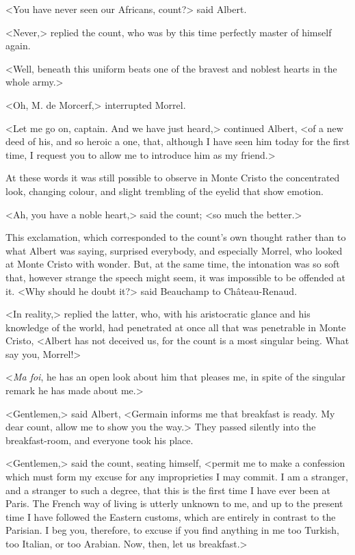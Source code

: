  <You have never seen our Africans, count?> said Albert. 

 <Never,> replied the count, who was by this time perfectly master of himself again. 

 <Well, beneath this uniform beats one of the bravest and noblest hearts in the whole army.> 

 <Oh, M. de Morcerf,> interrupted Morrel. 

 <Let me go on, captain. And we have just heard,> continued Albert, <of a new deed of his, and so heroic a one, that, although I have seen him today for the first time, I request you to allow me to introduce him as my friend.> 

 At these words it was still possible to observe in Monte Cristo the concentrated look, changing colour, and slight trembling of the eyelid that show emotion. 

 <Ah, you have a noble heart,> said the count; <so much the better.> 

 This exclamation, which corresponded to the count's own thought rather than to what Albert was saying, surprised everybody, and especially Morrel, who looked at Monte Cristo with wonder. But, at the same time, the intonation was so soft that, however strange the speech might seem, it was impossible to be offended at it.  <Why should he doubt it?> said Beauchamp to Château-Renaud. 

 <In reality,> replied the latter, who, with his aristocratic glance and his knowledge of the world, had penetrated at once all that was penetrable in Monte Cristo, <Albert has not deceived us, for the count is a most singular being. What say you, Morrel!> 

 <\textit{Ma foi}, he has an open look about him that pleases me, in spite of the singular remark he has made about me.> 

 <Gentlemen,> said Albert, <Germain informs me that breakfast is ready. My dear count, allow me to show you the way.> They passed silently into the breakfast-room, and everyone took his place. 

 <Gentlemen,> said the count, seating himself, <permit me to make a confession which must form my excuse for any improprieties I may commit. I am a stranger, and a stranger to such a degree, that this is the first time I have ever been at Paris. The French way of living is utterly unknown to me, and up to the present time I have followed the Eastern customs, which are entirely in contrast to the Parisian. I beg you, therefore, to excuse if you find anything in me too Turkish, too Italian, or too Arabian. Now, then, let us breakfast.> 

